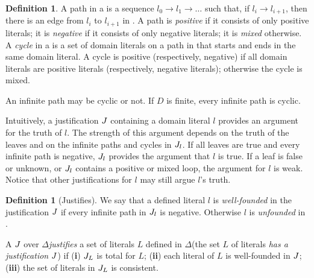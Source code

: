 \documentclass[11pt]{article}
\newcommand{\m}[1]{\ensuremath{#1}\xspace}
\newcommand{\ra}{\m{\rightarrow}}
\newcommand{\D}{\m{\Delta}}
\theoremstyle{plain}
\theoremstyle{definition}
\newtheorem{definition}[thm]{Definition}
\theoremstyle{example_basic}
\theoremstyle{example_contd}
\theoremstyle{plain}
\newcommand{\tbf}[1]{\textbf{#1}}
\newcommand{\change}[1]{#1}
\begin{document}
\begin{definition}
\change{A path in a \justification \jgraph is a sequence $l_0\ra l_1 \ra \dots$ such that, if $l_i\ra l_{i+1}$, then there is an edge from $l_i$ to $l_{i+1}$ in \jgraph. 
A path is \emph{positive} if it consists of only positive literals; it is \emph{negative} if it consists of only negative literals; it is \emph{mixed} otherwise. 
A \emph{cycle} in a \justification \jgraph is a set of domain literals
on a path in \jgraph that starts and ends in the same domain literal. A cycle is positive (respectively, negative) if all domain literals are positive literals (respectively, negative literals); otherwise the cycle is mixed.}
\end{definition}
\change{An infinite path may be cyclic or not. If $D$ is finite, every infinite path is cyclic.}

\change{Intuitively, a justification $J$ containing a domain literal $l$ provides an argument for the  truth of $l$. The strength of  this argument depends  on the truth of the leaves  and on the infinite paths and cycles in $J_l$.  If all leaves are true and every infinite path is negative, $J_l$ provides the argument that $l$ is true. If a leaf is false or unknown, or $J_l$ contains a positive or mixed loop, the argument for $l$ is weak. Notice that other justifications for $l$ may still argue $l$'s truth. }

\begin{definition}[Justifies]\label{def:justifies}
\change{We say that a defined literal $l$ is \emph{well-founded} in the justification $J$  if every infinite path in $J_l$ is negative. Otherwise $l$ is \emph{unfounded} in \jgraph.} 

A \justification $J$ over \D \emph{justifies} a set of literals $L$ defined in \D (the set $L$ of literals \emph{has a justification} $J$) if (\tbf{i}) $J_L$ is total for $L$; (\tbf{ii}) \change{each literal of $L$ is well-founded in $J$;} (\tbf{iii}) the set of literals in $J_L$ is consistent.
\end{definition} 
\end{document}
